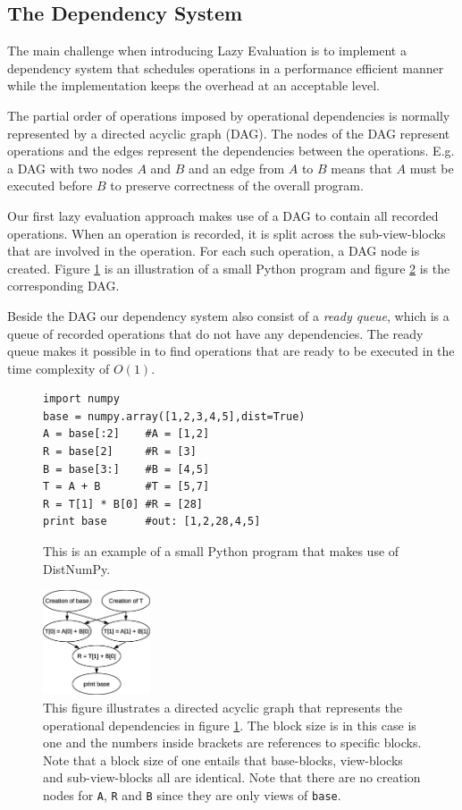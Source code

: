 \documentclass[preprint]{../PGAS10/sigplanconf}
\begin{document}
\subsection{The Dependency System}
The main challenge when introducing Lazy Evaluation is to implement a dependency system that schedules operations in a performance efficient manner while the implementation keeps the overhead at an acceptable level.

The partial order of operations imposed by operational dependencies is normally represented by a directed acyclic graph (DAG)\cite{AhSeUl86}. The nodes of the DAG represent operations and the edges represent the dependencies between the operations. E.g. a DAG with two nodes $A$ and $B$ and an edge from $A$ to $B$ means that $A$ must be executed before $B$ to preserve correctness of the overall program. 

Our first lazy evaluation approach makes use of a DAG to contain all recorded operations. When an operation is recorded, it is split across the sub-view-blocks that are involved in the operation. For each such operation, a DAG node is created. Figure \ref{lst:code_eg}  is an illustration of a small Python program and figure \ref{fig:DAG} is the corresponding DAG.
 
Beside the DAG our dependency system also consist of a \emph{ready queue}, which is a queue of recorded operations that do not have any dependencies. The ready queue makes it possible in to find operations that are ready to be executed in the time complexity of $O(1)$.

\begin{figure}
\begin{lstlisting}
import numpy
base = numpy.array([1,2,3,4,5],dist=True)
A = base[:2]    #A = [1,2]
R = base[2]     #R = [3]
B = base[3:]    #B = [4,5]
T = A + B       #T = [5,7]
R = T[1] * B[0] #R = [28]
print base      #out: [1,2,28,4,5]
\end{lstlisting}
 \caption{This is an example of a small Python program that makes use of DistNumPy.}
 \label{lst:code_eg}
\end{figure}

\begin{figure}
 \centering
 \includegraphics[width=120px]{gfx/dag}
 \caption{This figure illustrates a directed acyclic graph that represents the operational dependencies in figure \ref{lst:code_eg}. The block size is in this case is one and the numbers inside brackets are references to specific blocks. Note that a block size of one entails that base-blocks, view-blocks and sub-view-blocks all are identical. Note that there are no creation nodes for \texttt{A}, \texttt{R} and \texttt{B} since they are only views of \texttt{base}.}
 \label{fig:DAG}
\end{figure}
\end{document}
